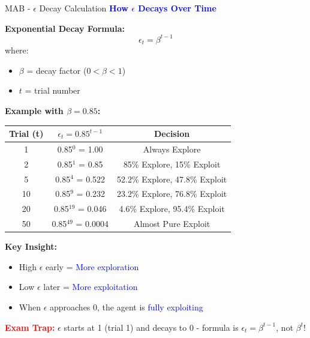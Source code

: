 \documentclass[8pt]{beamer}
\begin{document}
	\begin{frame}{MAB - $\epsilon$ Decay Calculation}
		\fontsize{6.5}{7.5}\selectfont
		\textcolor{blue}{\textbf{How $\epsilon$ Decays Over Time}}
		
		\textbf{Exponential Decay Formula:}
		\[
		\epsilon_t = \beta^{t-1}
		\]
		where:
		\begin{itemize}
			\item $\beta$ = decay factor ($0 < \beta < 1$)
			\item $t$ = trial number
		\end{itemize}
		
		\textbf{Example with $\beta = 0.85$:}
		
		\begin{tabular}{|c|c|c|}
			\hline
			\textbf{Trial (t)} & \textbf{$\epsilon_t = 0.85^{t-1}$} & \textbf{Decision} \\
			\hline
			1 & 0.85$^0$ = 1.00 & Always Explore \\
			\hline
			2 & 0.85$^1$ = 0.85 & 85\% Explore, 15\% Exploit \\
			\hline
			5 & 0.85$^4$ = 0.522 & 52.2\% Explore, 47.8\% Exploit \\
			\hline
			10 & 0.85$^9$ = 0.232 & 23.2\% Explore, 76.8\% Exploit \\
			\hline
			20 & 0.85$^{19}$ = 0.046 & 4.6\% Explore, 95.4\% Exploit \\
			\hline
			50 & 0.85$^{49}$ = 0.0004 & Almost Pure Exploit \\
			\hline
		\end{tabular}
		
		\textbf{Key Insight:}
		\begin{itemize}
			\item High $\epsilon$ early = \textcolor{blue}{More exploration}
			\item Low $\epsilon$ later = \textcolor{blue}{More exploitation}
			\item When $\epsilon$ approaches 0, the agent is \textcolor{blue}{fully exploiting}
		\end{itemize}
		
		\textcolor{red}{\textbf{Exam Trap:}} $\epsilon$ starts at 1 (trial 1) and decays to 0 - formula is $\epsilon_t = \beta^{t-1}$, not $\beta^t$!
	\end{frame}
	
\end{document}
